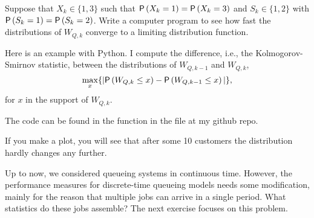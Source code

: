 \documentclass[companion]{subfiles}
\begin{document}
\begin{exercise}
 Suppose that $X_k\in\{1,3\}$ such that $\P{X_k=1}=\P{X_k=3}$ and
 $S_k\in\{1,2\}$ with $\P{S_k=1}=\P{S_k=2}$. Write a computer program
 to see how fast the distributions of $W_{Q,k}$ converge to a limiting distribution function.
\begin{solution}
 Here is an example with Python.
 I compute the difference, i.e., the Kolmogorov-Smirnov statistic, between the distributions of $W_{Q,k-1}$ and $W_{Q,k}$,
\begin{equation*}
 \max_x\{ |\P{W_{Q,k}\leq x} - \P{W_{Q,k-1}\leq x}|\},
\end{equation*}
for $x$ in the support of $W_{Q,k}$. 

The code can be found in the  function in the file  at
my github repo.

If you make a plot, you will see that after some 10 customers the distribution hardly changes any further. 

\end{solution}
\end{exercise}



Up to now, we considered queueing systems in continuous time.
However, the performance measures for discrete-time queueing models needs some modification, mainly for the reason that multiple jobs can arrive in a single period.
What statistics do these jobs assemble?
The next exercise focuses on this problem.
\end{document}
